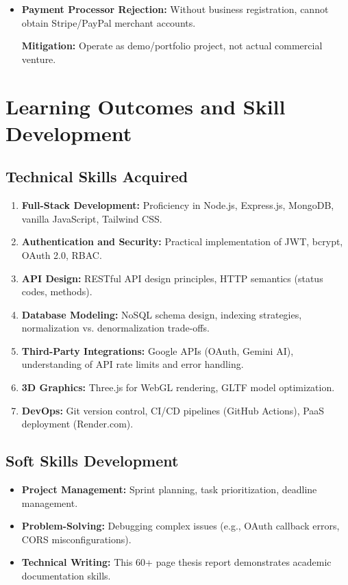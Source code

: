 \documentclass[12pt, a4paper]{report}
\begin{document}
{{\begin{itemize}
    \textbf{Mitigation:} Integrate GDPR-compliant consent management platform (e.g., Cookiebot).
    
    \item \textbf{Payment Processor Rejection:} Without business registration, cannot obtain Stripe/PayPal merchant accounts.
    
    \textbf{Mitigation:} Operate as demo/portfolio project, not actual commercial venture.
\end{itemize}

\section{Learning Outcomes and Skill Development}

\subsection{Technical Skills Acquired}

\begin{enumerate}
    \item \textbf{Full-Stack Development:} Proficiency in Node.js, Express.js, MongoDB, vanilla JavaScript, Tailwind CSS.
    \item \textbf{Authentication and Security:} Practical implementation of JWT, bcrypt, OAuth 2.0, RBAC.
    \item \textbf{API Design:} RESTful API design principles, HTTP semantics (status codes, methods).
    \item \textbf{Database Modeling:} NoSQL schema design, indexing strategies, normalization vs. denormalization trade-offs.
    \item \textbf{Third-Party Integrations:} Google APIs (OAuth, Gemini AI), understanding of API rate limits and error handling.
    \item \textbf{3D Graphics:} Three.js for WebGL rendering, GLTF model optimization.
    \item \textbf{DevOps:} Git version control, CI/CD pipelines (GitHub Actions), PaaS deployment (Render.com).
\end{enumerate}

\subsection{Soft Skills Development}

\begin{itemize}
    \item \textbf{Project Management:} Sprint planning, task prioritization, deadline management.
    \item \textbf{Problem-Solving:} Debugging complex issues (e.g., OAuth callback errors, CORS misconfigurations).
    \item \textbf{Technical Writing:} This 60+ page thesis report demonstrates academic documentation skills.
\end{itemize}

}}
\end{document}
